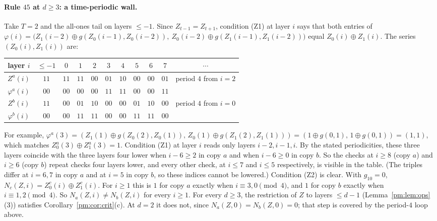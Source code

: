 \paragraph{Rule $45$ at $d\ge3$: a time-periodic wall.} Take $T=2$ and the all-ones tail on layers $\le-1$. Since $Z_{t-1}=Z_{t+1}$, condition (Z1) at layer $i$ says that both entries of $\varphi(i)=\bigl(Z_1(i-2)\oplus g(Z_0(i-1),Z_0(i-2)),\ Z_0(i-2)\oplus g(Z_1(i-1),Z_1(i-2))\bigr)$ equal $Z_0(i)\oplus Z_1(i)$. The series $(Z_0(i),Z_1(i))$ are:
\begin{center}
\begin{tabular}{ccccccccccc}
\toprule
layer $i$ & $\le-1$ & $0$ & $1$ & $2$ & $3$ & $4$ & $5$ & $6$ & $7$ & $\cdots$\\
\midrule
$Z^a(i)$ & $11$ & $11$ & $11$ & $00$ & $01$ & $10$ & $00$ & $00$ & $01$ & period $4$ from $i=2$\\
$\varphi^a(i)$ & $00$ & $00$ & $00$ & $00$ & $11$ & $11$ & $00$ & $00$ & $11$ & \\
$Z^b(i)$ & $11$ & $00$ & $01$ & $10$ & $00$ & $00$ & $01$ & $10$ & $00$ & period $4$ from $i=0$\\
$\varphi^b(i)$ & $00$ & $00$ & $11$ & $11$ & $00$ & $00$ & $11$ & $11$ & $00$ & \\
\bottomrule
\end{tabular}
\end{center}
For example, $\varphi^a(3)=(Z_1(1)\oplus g(Z_0(2),Z_0(1)),\,Z_0(1)\oplus g(Z_1(2),Z_1(1)))=(1\oplus g(0,1),\,1\oplus g(0,1))=(1,1)$, which matches $Z^a_0(3)\oplus Z^a_1(3)=1$. Condition (Z1) at layer $i$ reads only layers $i-2,i-1,i$. By the stated periodicities, these three layers coincide with the three layers four lower when $i-6\ge2$ in copy $a$ and when $i-6\ge0$ in copy $b$. So the checks at $i\ge8$ (copy $a$) and $i\ge6$ (copy $b$) repeat checks four layers lower, and every other check, at $i\le7$ and $i\le5$ respectively, is visible in the table. (The triples differ at $i=6,7$ in copy $a$ and at $i=5$ in copy $b$, so these indices cannot be lowered.) Condition (Z2) is clear. With $g_{10}=0$, $N_c(Z,i)=Z^c_0(i)\oplus Z^c_1(i)$. For $i\ge1$ this is $1$ for copy $a$ exactly when $i\equiv3,0\pmod4$, and $1$ for copy $b$ exactly when $i\equiv1,2\pmod4$. So $N_a(Z,i)\ne N_b(Z,i)$ for every $i\ge1$. For every $d\ge3$, the restriction of $Z$ to layers $\le d-1$ (Lemma~\ref{pm:lem:ops}(3)) satisfies Corollary~\ref{pm:cor:crit}(c). At $d=2$ it does not, since $N_a(Z,0)=N_b(Z,0)=0$; that step is covered by the period-$4$ loop above.

